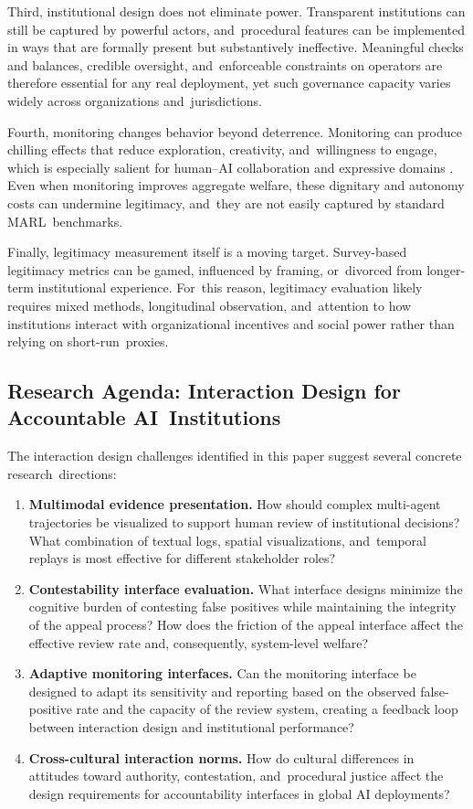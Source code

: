 \documentclass[mca,article,accept,pdftex,oneauthor]{Definitions/mdpi}
\begin{document}
Third, institutional design does not eliminate power. Transparent institutions can still be captured by powerful actors, and~procedural features can be implemented in ways that are formally present but substantively ineffective. Meaningful checks and balances, credible oversight, and~enforceable constraints on operators are therefore essential for any real deployment, yet such governance capacity varies widely across organizations and~jurisdictions.

Fourth, monitoring changes behavior beyond deterrence. Monitoring can produce chilling effects that reduce exploration, creativity, and~willingness to engage, which is especially salient for human--AI collaboration and expressive domains \citep{Lyon2007Surveillance}. Even when monitoring improves aggregate welfare, these dignitary and autonomy costs can undermine legitimacy, and~they are not easily captured by standard MARL~benchmarks.

Finally, legitimacy measurement itself is a moving target. Survey-based legitimacy metrics can be gamed, influenced by framing, or~divorced from longer-term institutional experience. For~this reason, legitimacy evaluation likely requires mixed methods, longitudinal observation, and~attention to how institutions interact with organizational incentives and social power rather than relying on short-run~proxies.

\subsection{Research Agenda: Interaction Design for Accountable AI~Institutions}

The interaction design challenges identified in this paper suggest several concrete research~directions:
\begin{enumerate}[leftmargin=*]
\item \textbf{Multimodal evidence presentation.} How should complex multi-agent trajectories be visualized to support human review of institutional decisions? What combination of textual logs, spatial visualizations, and~temporal replays is most effective for different stakeholder roles?
\item \textbf{Contestability interface evaluation.} What interface designs minimize the cognitive burden of contesting false positives while maintaining the integrity of the appeal process? How does the friction of the appeal interface affect the effective review rate and, consequently, system-level welfare?
\item \textbf{Adaptive monitoring interfaces.} Can the monitoring interface be designed to adapt its sensitivity and reporting based on the observed false-positive rate and the capacity of the review system, creating a feedback loop between interaction design and institutional performance?
\item \textbf{Cross-cultural interaction norms.} How do cultural differences in attitudes toward authority, contestation, and~procedural justice affect the design requirements for accountability interfaces in global AI deployments?
\end{enumerate}
\end{document}

